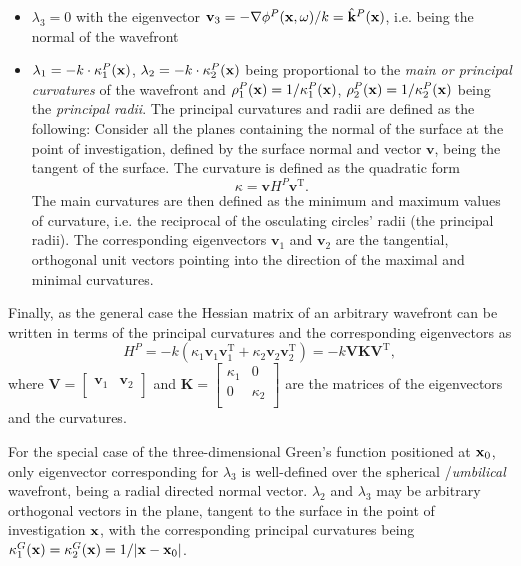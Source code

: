 \begin{itemize}
\item $\lambda_3 = 0$ with the eigenvector $\mathbf{v}_3 = - \nabla \phi^P(\mathbf{x},\omega) /k = \hat{\mathbf{k}}^P(\mathbf{x})$, i.e. being the normal of the wavefront
\item $\lambda_1 = -k \cdot \kappa^P_1(\mathbf{x})$, $\lambda_2 = -k \cdot	\kappa^P_2(\mathbf{x})$ being proportional to the \emph{main or principal curvatures} of the wavefront and $\rho^P_1(\mathbf{x}) = 1 /\kappa^P_1(\mathbf{x})$, $\rho^P_2(\mathbf{x}) = 1 /\kappa^P_2(\mathbf{x})$ being the \emph{principal radii}.
The principal curvatures and radii are defined as the following:
Consider all the planes containing the normal of the surface at the point of investigation, defined by the surface normal and vector $\mathbf{v}$, being the tangent of the surface.
The curvature is defined as the quadratic form 
\begin{equation}
\kappa = \mathbf{v} H^P \mathbf{v}^{\mathrm{T}}.
\label{Eq:App:curvature_def}
\end{equation}
The main curvatures are then defined as the minimum and maximum values of curvature, i.e. the reciprocal of the osculating circles' radii (the principal radii).
The corresponding eigenvectors $\mathbf{v}_1$ and $\mathbf{v}_2$ are the tangential, orthogonal unit vectors pointing into the direction of the maximal and minimal curvatures.
\end{itemize}
Finally, as the general case the Hessian matrix of an arbitrary wavefront can be written in terms of the principal curvatures and the corresponding eigenvectors as
\begin{equation}
H^P = -k \left( \kappa_1  \mathbf{v}_1 \mathbf{v}_1^\mathrm{T} + \kappa_2 \mathbf{v}_2 \mathbf{v}_2^\mathrm{T} \right) = -k \mathbf{V} \mathbf{K} \mathbf{V}^{\mathrm{T}},
\label{Eq:App:Hessian_w_curvature}
\end{equation}
where $\mathbf{V} = \begin{bmatrix} \mathbf{v}_1 & \mathbf{v}_2 \\\end{bmatrix}$ and $\mathbf{K} = \begin{bmatrix} \kappa_1 & 0 \\[.0em] 0 & \kappa_2 \\[0.0em] \end{bmatrix}$ are the matrices of the eigenvectors and the curvatures.

For the special case of the three-dimensional Green's function positioned at $\mathbf{x}_0$, only eigenvector corresponding for $\lambda_3$ is well-defined over the spherical /\emph{umbilical} wavefront, being a radial directed normal vector.
$\lambda_2$ and $\lambda_3$ may be arbitrary orthogonal vectors in the plane, tangent to the surface in the point of investigation $\mathbf{x}$, with the corresponding principal curvatures being $\kappa_1^G(\mathbf{x}) = \kappa_2^G(\mathbf{x}) = 1/|\mathbf{x} - \mathbf{x}_0| $.

